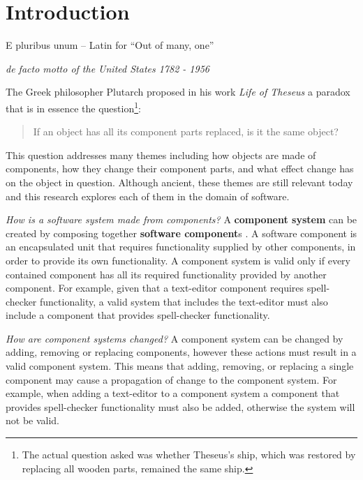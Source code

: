 \chapter{Introduction}
\label{introduction}
\epigraph{E pluribus unum -- Latin for ``Out of many, one''}
{\textit{de facto motto of the United States 1782 - 1956}}
The Greek philosopher Plutarch proposed in his work \textit{Life of Theseus} a paradox that is in essence the question\footnote{The actual question asked was whether Theseus's ship, which was restored by replacing all wooden parts, remained the same ship.}:
\begin{quote}
If an object has all its component parts replaced, is it the same object?
\end{quote}
This question addresses many themes including how objects are made of components, how they change their component parts,
and what effect change has on the object in question.
Although ancient, 
these themes are still relevant today and this research explores each of them in the domain of software.

\textit{How is a software system made from components?}
A \textbf{component system} can be created by composing together \textbf{software component}s \citep{Szyperski2002}.
A software component is an encapsulated unit that requires functionality supplied by other components, in order to provide its own functionality. 
A component system is valid only if every contained component has all its required functionality provided by another component.
For example, given that a text-editor component requires spell-checker functionality, 
a valid system that includes the text-editor must also include a component that provides spell-checker functionality.


\textit{How are component systems changed?}
A component system can be changed by adding, removing or replacing components, however these actions must result in a valid component system.
This means that adding, removing, or replacing a single component may cause a propagation of change to the component system.
For example, when adding a text-editor to a component system 
a component that provides spell-checker functionality must also be added, otherwise the system will not be valid.

